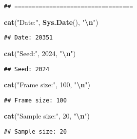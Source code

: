 \documentclass[
]{article}
\newenvironment{Shaded}{\begin{snugshade}}{\end{snugshade}}
\newcommand{\DecValTok}[1]{\textcolor[rgb]{0.00,0.00,0.81}{#1}}
\newcommand{\FunctionTok}[1]{\textcolor[rgb]{0.13,0.29,0.53}{\textbf{#1}}}
\newcommand{\NormalTok}[1]{#1}
\newcommand{\SpecialCharTok}[1]{\textcolor[rgb]{0.81,0.36,0.00}{\textbf{#1}}}
\newcommand{\StringTok}[1]{\textcolor[rgb]{0.31,0.60,0.02}{#1}}
\begin{document}
\begin{verbatim}
## ==================================
\end{verbatim}

\begin{Shaded}
\begin{Highlighting}[]
\FunctionTok{cat}\NormalTok{(}\StringTok{"Date:"}\NormalTok{, }\FunctionTok{Sys.Date}\NormalTok{(), }\StringTok{"}\SpecialCharTok{\textbackslash{}n}\StringTok{"}\NormalTok{)}
\end{Highlighting}
\end{Shaded}

\begin{verbatim}
## Date: 20351
\end{verbatim}

\begin{Shaded}
\begin{Highlighting}[]
\FunctionTok{cat}\NormalTok{(}\StringTok{"Seed:"}\NormalTok{, }\DecValTok{2024}\NormalTok{, }\StringTok{"}\SpecialCharTok{\textbackslash{}n}\StringTok{"}\NormalTok{)}
\end{Highlighting}
\end{Shaded}

\begin{verbatim}
## Seed: 2024
\end{verbatim}

\begin{Shaded}
\begin{Highlighting}[]
\FunctionTok{cat}\NormalTok{(}\StringTok{"Frame size:"}\NormalTok{, }\DecValTok{100}\NormalTok{, }\StringTok{"}\SpecialCharTok{\textbackslash{}n}\StringTok{"}\NormalTok{)}
\end{Highlighting}
\end{Shaded}

\begin{verbatim}
## Frame size: 100
\end{verbatim}

\begin{Shaded}
\begin{Highlighting}[]
\FunctionTok{cat}\NormalTok{(}\StringTok{"Sample size:"}\NormalTok{, }\DecValTok{20}\NormalTok{, }\StringTok{"}\SpecialCharTok{\textbackslash{}n}\StringTok{"}\NormalTok{)}
\end{Highlighting}
\end{Shaded}

\begin{verbatim}
## Sample size: 20
\end{verbatim}
\end{document}
